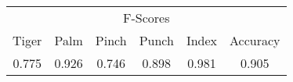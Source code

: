 \documentclass{standalone}
\begin{document}
 
 \begin{tabular}{|c|c|c|c|c ||c|}
\cline{1-6}\multicolumn{6}{|c|}{F-Scores} \\ 
\cline{1-6}Tiger & Palm & Pinch & Punch & Index & Accuracy\\ 
\cline{1-6}0.775 & 0.926 & 0.746 & 0.898 & 0.981 & 0.905\\ 
 \cline{1-6}\hline \end{tabular}
 
\end{document}
